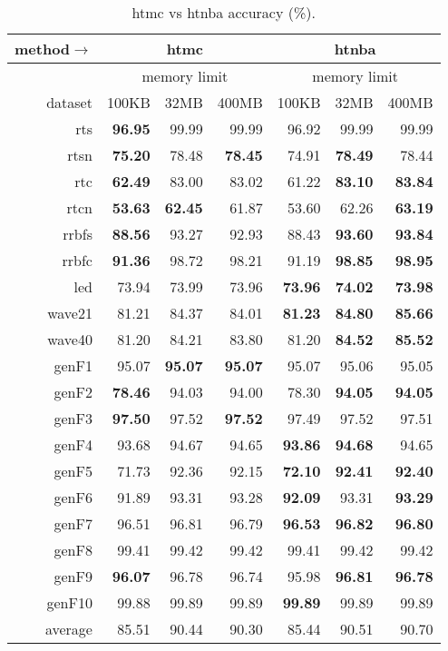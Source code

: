 \begin{table}
\caption{{\sc htmc} vs {\sc htnba} accuracy (\%).}
\label{tab:htmc_vs_htnba_acc}
\centering
\begin{tabular}{|r||r|r|r||r|r|r|}
\hline
method$\rightarrow$ & \multicolumn{3}{|c||}{{\sc htmc}} & \multicolumn{3}{|c|}{{\sc htnba}} \\
\hline
 & \multicolumn{3}{|c||}{memory limit} & \multicolumn{3}{|c|}{memory limit} \\
\hline
dataset & 100KB & 32MB & 400MB & 100KB & 32MB & 400MB \\
\hline
{\sc rts} & \textbf{96.95} & 99.99 & 99.99 & 96.92 & 99.99 & 99.99 \\
{\sc rtsn} & \textbf{75.20} & 78.48 & \textbf{78.45} & 74.91 & \textbf{78.49} & 78.44 \\
{\sc rtc} & \textbf{62.49} & 83.00 & 83.02 & 61.22 & \textbf{83.10} & \textbf{83.84} \\
{\sc rtcn} & \textbf{53.63} & \textbf{62.45} & 61.87 & 53.60 & 62.26 & \textbf{63.19} \\
{\sc rrbfs} & \textbf{88.56} & 93.27 & 92.93 & 88.43 & \textbf{93.60} & \textbf{93.84} \\
{\sc rrbfc} & \textbf{91.36} & 98.72 & 98.21 & 91.19 & \textbf{98.85} & \textbf{98.95} \\
{\sc led} & 73.94 & 73.99 & 73.96 & \textbf{73.96} & \textbf{74.02} & \textbf{73.98} \\
{\sc wave21} & 81.21 & 84.37 & 84.01 & \textbf{81.23} & \textbf{84.80} & \textbf{85.66} \\
{\sc wave40} & 81.20 & 84.21 & 83.80 & 81.20 & \textbf{84.52} & \textbf{85.52} \\
{\sc genF1} & 95.07 & \textbf{95.07} & \textbf{95.07} & 95.07 & 95.06 & 95.05 \\
{\sc genF2} & \textbf{78.46} & 94.03 & 94.00 & 78.30 & \textbf{94.05} & \textbf{94.05} \\
{\sc genF3} & \textbf{97.50} & 97.52 & \textbf{97.52} & 97.49 & 97.52 & 97.51 \\
{\sc genF4} & 93.68 & 94.67 & 94.65 & \textbf{93.86} & \textbf{94.68} & 94.65 \\
{\sc genF5} & 71.73 & 92.36 & 92.15 & \textbf{72.10} & \textbf{92.41} & \textbf{92.40} \\
{\sc genF6} & 91.89 & 93.31 & 93.28 & \textbf{92.09} & 93.31 & \textbf{93.29} \\
{\sc genF7} & 96.51 & 96.81 & 96.79 & \textbf{96.53} & \textbf{96.82} & \textbf{96.80} \\
{\sc genF8} & 99.41 & 99.42 & 99.42 & 99.41 & 99.42 & 99.42 \\
{\sc genF9} & \textbf{96.07} & 96.78 & 96.74 & 95.98 & \textbf{96.81} & \textbf{96.78} \\
{\sc genF10} & 99.88 & 99.89 & 99.89 & \textbf{99.89} & 99.89 & 99.89 \\
\hline
average & 85.51 & 90.44 & 90.30 & 85.44 & 90.51 & 90.70 \\
\hline
\end{tabular}
\end{table}

